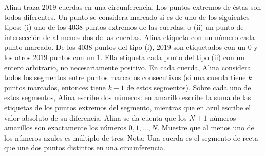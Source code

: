 Alina traza $2019$ cuerdas en una circunferencia. Los puntos extremos de éstas son
todos diferentes. Un punto se considera marcado si es de uno de los siguientes tipos:
(i) uno de los $4038$ puntos extremos de las cuerdas; o
(ii) un punto de intersección de al menos dos de las cuerdas.
Alina etiqueta con un número cada punto marcado. De los $4038$ puntos del tipo (i), $2019$ son etiquetados con un $0$ y los otros $2019$ puntos con un $1$. Ella etiqueta cada punto del tipo (ii) con un entero
arbitrario, no necesariamente positivo.
En cada cuerda, Alina considera todos los segmentos entre puntos marcados consecutivos (si una
cuerda tiene $k$ puntos marcados, entonces tiene $k - 1$ de estos segmentos). Sobre cada uno de estos
segmentos, Alina escribe dos números: en amarillo escribe la suma de las etiquetas de los puntos
extremos del segmento, mientras que en azul escribe el valor absoluto de su diferencia.
Alina se da cuenta que los $N + 1$ números amarillos son exactamente los números $0, 1,\dots , N$.
Muestre que al menos uno de los números azules es múltiplo de tres.
Nota: Una cuerda es el segmento de recta que une dos puntos distintos en una circunferencia.